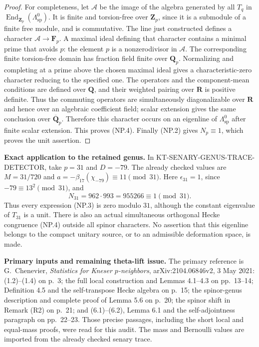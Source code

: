 \documentclass[11pt,a4paper]{article}
\theoremstyle{definition}
\renewcommand{\paragraph}[1]{\par\smallskip\noindent\textbf{#1}\quad\ignorespaces}
\begin{document}
\begin{proof}
For completeness, let $\mathcal A$ be the image of the algebra generated
by all $T_q$ in $\operatorname{End}_{\mathbf Z_p}(\Lambda^0_{\mathrm{sp}})$.
It is finite and torsion-free over $\mathbf Z_p$, since it is a
submodule of a finite free module, and is commutative.  The line just
constructed defines a character $\mathcal A\to\mathbf F_p$.
A maximal ideal defining that character contains a minimal prime that
avoids $p$: the element $p$ is a nonzerodivisor in $\mathcal A$.
The corresponding finite torsion-free domain has fraction field finite
over $\mathbf Q_p$.  Normalizing and completing at a prime above the
chosen maximal ideal gives a characteristic-zero character reducing to
the specified one.  The operators and the component-mean conditions
are defined over $\mathbf Q$, and their weighted pairing over $\mathbf R$
is positive definite.  Thus the commuting operators are simultaneously
diagonalizable over $\mathbf R$ and hence over an algebraic coefficient
field; scalar extension gives the same conclusion over $\overline{\mathbf Q}_p$.
Therefore this character
occurs on an eigenline of $\Lambda^0_{\mathrm{sp}}$ after finite scalar
extension.  This proves (NP.4).  Finally (NP.2) gives $N_p\equiv1$,
which proves the unit assertion.
\end{proof}

\paragraph{Exact application to the retained genus.}
In KT-SENARY-GENUS-TRACE-DETECTOR, take $p=31$ and $D=-79$.
The already checked values are $M=31/720$ and
$a=-\beta_{17}(\chi_{-79})\equiv11\pmod{31}$.
Here $\epsilon_{31}=1$, since $-79\equiv13^2\pmod{31}$, and
\[
                  N_{31}=962\cdot993=955266\equiv1\pmod{31}.
\]
Thus every expression (NP.3) is zero modulo $31$, although the
constant eigenvalue of $T_{31}$ is a unit.  There is also an actual
simultaneous orthogonal Hecke congruence (NP.4) outside all spinor
characters.  No assertion that this eigenline belongs to the compact
unitary source, or to an admissible deformation space, is made.

\paragraph{Primary inputs and remaining theta-lift issue.}
The primary reference is G.~Chenevier, \emph{Statistics for Kneser
$p$-neighbors}, arXiv:2104.06846v2, 3 May 2021: (1.2)--(1.4) on
p.~3; the full local construction and Lemmas 4.1--4.3 on pp.~13--14;
Definition 4.5 and the self-transpose Hecke algebra on p.~15;
the spinor-genus description and complete proof of Lemma 5.6 on
p.~20; the spinor shift in Remark (R2) on p.~21; and (6.1)--(6.2),
Lemma 6.1 and the self-adjointness paragraph on pp.~22--23.
Those precise passages, including the short local and equal-mass
proofs, were read for this audit.  The mass and Bernoulli values are
imported from the already checked senary trace.
\end{document}
